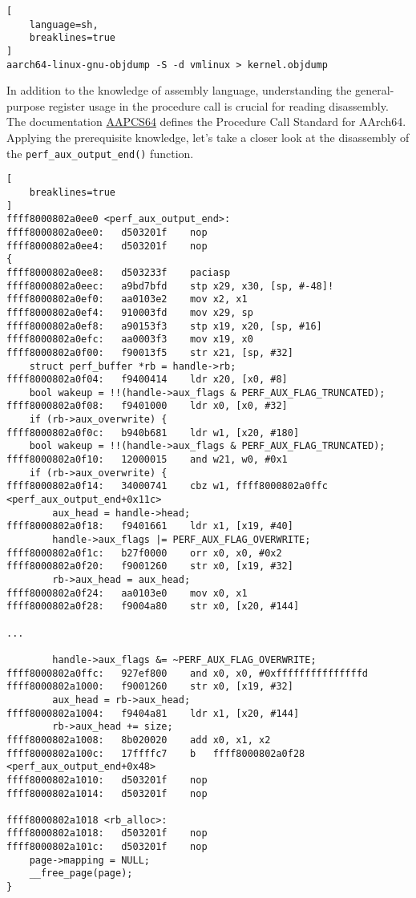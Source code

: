 \documentclass[11pt]{diazessay} %
\def\code#1{\texttt{#1}}
\begin{document}
\begin{lstlisting}[
  	language=sh,
	breaklines=true
]
aarch64-linux-gnu-objdump -S -d vmlinux > kernel.objdump
\end{lstlisting}

In addition to the knowledge of assembly language, understanding the
general-purpose register usage in the procedure call is crucial for reading
disassembly. The documentation
\href{https://github.com/ARM-software/abi-aa/releases/download/2023Q3/aapcs64.pdf}{AAPCS64}
defines the Procedure Call Standard for AArch64. Applying the prerequisite
knowledge, let’s take a closer look at the disassembly of the
\code{perf\_aux\_output\_end()} function.

\begin{lstlisting}[
	breaklines=true
]
ffff8000802a0ee0 <perf_aux_output_end>:
ffff8000802a0ee0:	d503201f 	nop
ffff8000802a0ee4:	d503201f 	nop
{
ffff8000802a0ee8:	d503233f 	paciasp
ffff8000802a0eec:	a9bd7bfd 	stp	x29, x30, [sp, #-48]!
ffff8000802a0ef0:	aa0103e2 	mov	x2, x1
ffff8000802a0ef4:	910003fd 	mov	x29, sp
ffff8000802a0ef8:	a90153f3 	stp	x19, x20, [sp, #16]
ffff8000802a0efc:	aa0003f3 	mov	x19, x0
ffff8000802a0f00:	f90013f5 	str	x21, [sp, #32]
	struct perf_buffer *rb = handle->rb;
ffff8000802a0f04:	f9400414 	ldr	x20, [x0, #8]
	bool wakeup = !!(handle->aux_flags & PERF_AUX_FLAG_TRUNCATED);
ffff8000802a0f08:	f9401000 	ldr	x0, [x0, #32]
	if (rb->aux_overwrite) {
ffff8000802a0f0c:	b940b681 	ldr	w1, [x20, #180]
	bool wakeup = !!(handle->aux_flags & PERF_AUX_FLAG_TRUNCATED);
ffff8000802a0f10:	12000015 	and	w21, w0, #0x1
	if (rb->aux_overwrite) {
ffff8000802a0f14:	34000741 	cbz	w1, ffff8000802a0ffc <perf_aux_output_end+0x11c>
		aux_head = handle->head;
ffff8000802a0f18:	f9401661 	ldr	x1, [x19, #40]
		handle->aux_flags |= PERF_AUX_FLAG_OVERWRITE;
ffff8000802a0f1c:	b27f0000 	orr	x0, x0, #0x2
ffff8000802a0f20:	f9001260 	str	x0, [x19, #32]
		rb->aux_head = aux_head;
ffff8000802a0f24:	aa0103e0 	mov	x0, x1
ffff8000802a0f28:	f9004a80 	str	x0, [x20, #144]

...

		handle->aux_flags &= ~PERF_AUX_FLAG_OVERWRITE;
ffff8000802a0ffc:	927ef800 	and	x0, x0, #0xfffffffffffffffd
ffff8000802a1000:	f9001260 	str	x0, [x19, #32]
		aux_head = rb->aux_head;
ffff8000802a1004:	f9404a81 	ldr	x1, [x20, #144]
		rb->aux_head += size;
ffff8000802a1008:	8b020020 	add	x0, x1, x2
ffff8000802a100c:	17ffffc7 	b	ffff8000802a0f28 <perf_aux_output_end+0x48>
ffff8000802a1010:	d503201f 	nop
ffff8000802a1014:	d503201f 	nop

ffff8000802a1018 <rb_alloc>:
ffff8000802a1018:	d503201f 	nop
ffff8000802a101c:	d503201f 	nop
	page->mapping = NULL;
	__free_page(page);
}
\end{lstlisting}
\end{document}
